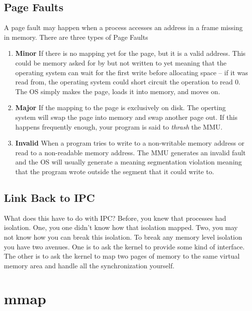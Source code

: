 \subsection{Page Faults}

A page fault may happen when a process accesses an address in a frame missing in memory.
There are three types of Page Faults

\begin{enumerate}
\item \textbf{Minor} If there is no mapping yet for the page, but it is a valid address.
  This could be memory asked for by  but not written to yet meaning that the operating system can wait for the first write before allocating space -- if it was read from, the operating system could short circuit the operation to read 0.
  The OS simply makes the page, loads it into memory, and moves on.

\item \textbf{Major} If the mapping to the page is exclusively on disk.
  The operting system will swap the page into memory and swap another page out.
  If this happens frequently enough, your program is said to \emph{thrash} the MMU.

\item \textbf{Invalid} When a program tries to write to a non-writable memory address or read to a non-readable memory address.
  The MMU generates an invalid fault and the OS will usually generate a  meaning segmentation violation meaning that the program wrote outside the segment that it could write to.

\end{enumerate}

\subsection{Link Back to IPC}

What does this have to do with IPC?
Before, you knew that processes had isolation.
One, you one didn't know how that isolation mapped.
Two, you may not know how you can break this isolation.
To break any memory level isolation you have two avenues.
One is to ask the kernel to provide some kind of interface.
The other is to ask the kernel to map two pages of memory to the same virtual memory area and handle all the synchronization yourself.

\section{mmap}

